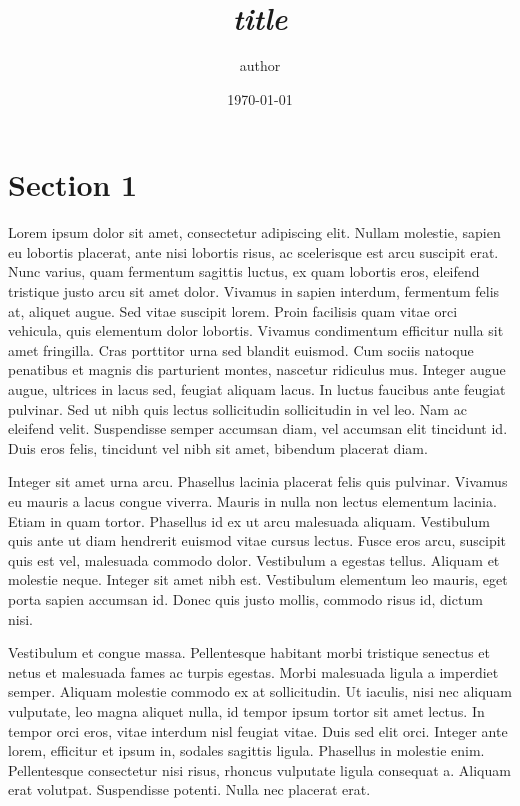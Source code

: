 \documentclass[a4paper]{article}
\title{\emph{ {{ title }} }}
\author{ {{ author }} }
\date{\today{}}
\begin{document}
\maketitle

\section{Section 1}

Lorem ipsum dolor sit amet, consectetur adipiscing elit. Nullam
molestie, sapien eu lobortis placerat, ante nisi lobortis risus, ac
scelerisque est arcu suscipit erat. Nunc varius, quam fermentum
sagittis luctus, ex quam lobortis eros, eleifend tristique justo arcu
sit amet dolor. Vivamus in sapien interdum, fermentum felis at,
aliquet augue. Sed vitae suscipit lorem. Proin facilisis quam vitae
orci vehicula, quis elementum dolor lobortis. Vivamus condimentum
efficitur nulla sit amet fringilla. Cras porttitor urna sed blandit
euismod. Cum sociis natoque penatibus et magnis dis parturient montes,
nascetur ridiculus mus. Integer augue augue, ultrices in lacus sed,
feugiat aliquam lacus. In luctus faucibus ante feugiat pulvinar. Sed
ut nibh quis lectus sollicitudin sollicitudin in vel leo. Nam ac
eleifend velit. Suspendisse semper accumsan diam, vel accumsan elit
tincidunt id. Duis eros felis, tincidunt vel nibh sit amet, bibendum
placerat diam.


Integer sit amet urna arcu. Phasellus lacinia placerat felis quis
pulvinar. Vivamus eu mauris a lacus congue viverra. Mauris in nulla
non lectus elementum lacinia. Etiam in quam tortor. Phasellus id ex ut
arcu malesuada aliquam. Vestibulum quis ante ut diam hendrerit euismod
vitae cursus lectus. Fusce eros arcu, suscipit quis est vel, malesuada
commodo dolor. Vestibulum a egestas tellus. Aliquam et molestie
neque. Integer sit amet nibh est. Vestibulum elementum leo mauris,
eget porta sapien accumsan id. Donec quis justo mollis, commodo risus
id, dictum nisi.


Vestibulum et congue massa. Pellentesque habitant morbi tristique
senectus et netus et malesuada fames ac turpis egestas. Morbi
malesuada ligula a imperdiet semper. Aliquam molestie commodo ex at
sollicitudin. Ut iaculis, nisi nec aliquam vulputate, leo magna
aliquet nulla, id tempor ipsum tortor sit amet lectus. In tempor orci
eros, vitae interdum nisl feugiat vitae. Duis sed elit orci. Integer
ante lorem, efficitur et ipsum in, sodales sagittis ligula. Phasellus
in molestie enim. Pellentesque consectetur nisi risus, rhoncus
vulputate ligula consequat a. Aliquam erat volutpat. Suspendisse
potenti. Nulla nec placerat erat.
\end{document}

